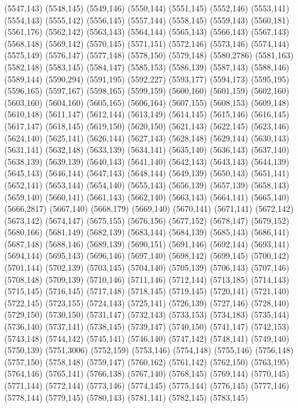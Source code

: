 (5547,143)
(5548,145)
(5549,146)
(5550,144)
(5551,145)
(5552,146)
(5553,141)
(5554,143)
(5555,142)
(5556,145)
(5557,144)
(5558,145)
(5559,143)
(5560,181)
(5561,176)
(5562,142)
(5563,143)
(5564,144)
(5565,143)
(5566,143)
(5567,143)
(5568,148)
(5569,142)
(5570,145)
(5571,151)
(5572,146)
(5573,146)
(5574,144)
(5575,149)
(5576,147)
(5577,148)
(5578,150)
(5579,148)
(5580,2786)
(5581,163)
(5582,148)
(5583,145)
(5584,147)
(5585,153)
(5586,139)
(5587,143)
(5588,146)
(5589,144)
(5590,294)
(5591,195)
(5592,227)
(5593,177)
(5594,173)
(5595,195)
(5596,165)
(5597,167)
(5598,165)
(5599,159)
(5600,160)
(5601,159)
(5602,160)
(5603,160)
(5604,160)
(5605,165)
(5606,164)
(5607,155)
(5608,153)
(5609,148)
(5610,148)
(5611,147)
(5612,144)
(5613,149)
(5614,145)
(5615,146)
(5616,145)
(5617,147)
(5618,145)
(5619,150)
(5620,150)
(5621,143)
(5622,145)
(5623,146)
(5624,140)
(5625,141)
(5626,144)
(5627,143)
(5628,148)
(5629,144)
(5630,143)
(5631,141)
(5632,148)
(5633,139)
(5634,141)
(5635,140)
(5636,143)
(5637,140)
(5638,139)
(5639,139)
(5640,143)
(5641,140)
(5642,143)
(5643,143)
(5644,139)
(5645,143)
(5646,144)
(5647,143)
(5648,144)
(5649,139)
(5650,143)
(5651,141)
(5652,141)
(5653,144)
(5654,140)
(5655,143)
(5656,139)
(5657,139)
(5658,143)
(5659,140)
(5660,141)
(5661,143)
(5662,140)
(5663,143)
(5664,141)
(5665,140)
(5666,2817)
(5667,140)
(5668,179)
(5669,140)
(5670,141)
(5671,141)
(5672,142)
(5673,142)
(5674,147)
(5675,155)
(5676,156)
(5677,152)
(5678,147)
(5679,152)
(5680,166)
(5681,149)
(5682,139)
(5683,144)
(5684,139)
(5685,143)
(5686,141)
(5687,148)
(5688,146)
(5689,139)
(5690,151)
(5691,146)
(5692,144)
(5693,141)
(5694,144)
(5695,143)
(5696,146)
(5697,140)
(5698,142)
(5699,145)
(5700,142)
(5701,144)
(5702,139)
(5703,145)
(5704,140)
(5705,139)
(5706,143)
(5707,146)
(5708,148)
(5709,139)
(5710,146)
(5711,146)
(5712,144)
(5713,185)
(5714,143)
(5715,145)
(5716,145)
(5717,148)
(5718,145)
(5719,145)
(5720,141)
(5721,140)
(5722,145)
(5723,155)
(5724,143)
(5725,141)
(5726,139)
(5727,146)
(5728,140)
(5729,150)
(5730,150)
(5731,147)
(5732,143)
(5733,153)
(5734,183)
(5735,144)
(5736,140)
(5737,141)
(5738,145)
(5739,147)
(5740,150)
(5741,147)
(5742,153)
(5743,148)
(5744,142)
(5745,141)
(5746,140)
(5747,142)
(5748,141)
(5749,140)
(5750,139)
(5751,3006)
(5752,159)
(5753,146)
(5754,148)
(5755,146)
(5756,148)
(5757,150)
(5758,148)
(5759,147)
(5760,162)
(5761,142)
(5762,150)
(5763,195)
(5764,146)
(5765,141)
(5766,138)
(5767,140)
(5768,145)
(5769,144)
(5770,145)
(5771,144)
(5772,144)
(5773,146)
(5774,145)
(5775,144)
(5776,145)
(5777,146)
(5778,144)
(5779,145)
(5780,143)
(5781,141)
(5782,145)
(5783,145)

